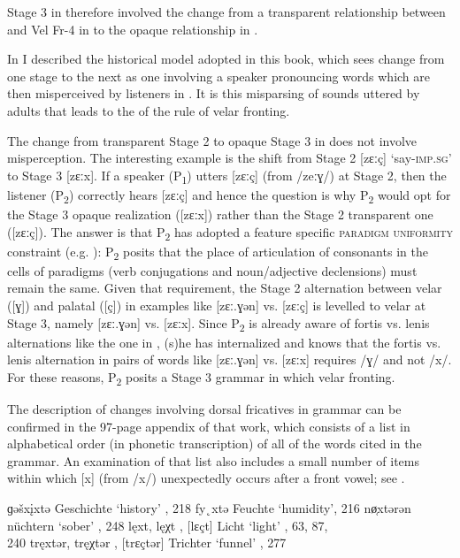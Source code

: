 Stage 3 in  therefore involved the change from a transparent relationship between  and Vel Fr-4 in  to the opaque relationship in .

In  I described the historical model adopted in this book, which sees change from one stage to the next as one involving a speaker pronouncing words which are then misperceived by listeners in . It is this misparsing of sounds uttered by adults that leads to the  of the rule of velar fronting.

The change from transparent Stage 2 to opaque Stage 3 in  does not involve misperception. The interesting example is the shift from Stage 2 [zɛːç] ‘say-\textsc{imp}.\textsc{sg}’ to Stage 3 [zɛːx]. If a speaker (P\textsubscript{1}) utters [zɛːç] (from /zeːɣ/) at Stage 2, then the listener (P\textsubscript{2}) correctly hears [zɛːç] and hence the question is why P\textsubscript{2} would opt for the Stage 3 opaque realization ([zɛːx]) rather than the Stage 2 transparent one ([zɛːç]). The answer is that P\textsubscript{2} has adopted a feature specific \textsc{paradigm uniformity} constraint (e.g. \citealt{DowningRaffelsiefen2005}): P\textsubscript{2} posits that the place of articulation of consonants in the cells of paradigms (verb conjugations and noun/adjective declensions) must remain the same. Given that requirement, the Stage 2 alternation between velar ([ɣ]) and palatal ([ç]) in examples like [zɛː.ɣən] vs. [zɛːç] is levelled to velar at Stage 3, namely [zɛː.ɣən] vs. [zɛːx]. Since P\textsubscript{2} is already aware of fortis vs. lenis alternations like the one in , (s)he has internalized  and knows that the fortis vs. lenis alternation in pairs of words like [zɛː.ɣən] vs. [zɛːx] requires /ɣ/ and not /x/. For these reasons, P\textsubscript{2} posits a Stage 3 grammar in which   velar fronting.

The description of changes involving dorsal fricatives in  grammar can be confirmed in the 97-page appendix of that work, which consists of a list in alphabetical order (in phonetic transcription) of all of the words cited in the grammar. An examination of that list also includes a small number of items within which [x] (from /x/) unexpectedly occurs after a front vowel; see .

\ea\label{ex:5:13}
\ea\label{ex:5:13a} ɡəšx\k{i}xtə     \tab [gəʃxɪxtə]           \tab Geschichte \tab ‘history’ , 218
\ex\label{ex:5:13b} fy˛xtə           \tab [fʏxtə]              \tab Feuchte    \tab ‘humidity’, 216
\ex\label{ex:5:13c} nø̜xtərən        \tab  [nœxtərən]           \tab  nüchtern  \tab  ‘sober’  , 248
\ex\label{ex:5:13d} lęxt, lęχt       \tab [lɛxt], [lɛçt]       \tab Licht      \tab ‘light’   , 63, 87, \\  240
\ex\label{ex:5:13e} tręxtər, tręχtər \tab [trɛxtər], [trɛçtər] \tab Trichter   \tab ‘funnel’  , 277
\z 
\z 

